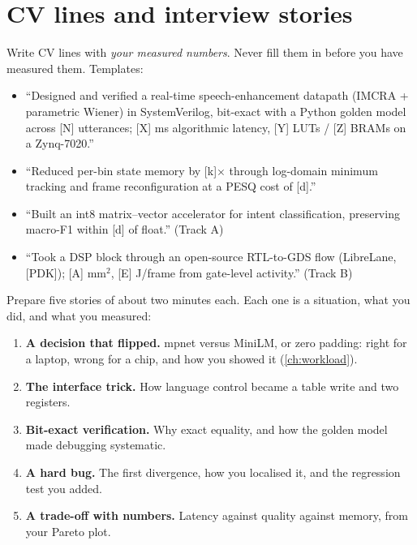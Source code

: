 \section{CV lines and interview stories}\label{sec:writeup:cv}

Write CV lines with \emph{your measured numbers}. Never fill them in before you
have measured them. Templates:
\begin{itemize}
  \item \enquote{Designed and verified a real-time speech-enhancement datapath
        (IMCRA + parametric Wiener) in SystemVerilog, bit-exact with a Python
        golden model across [N] utterances; [X] ms algorithmic latency, [Y]
        LUTs / [Z] BRAMs on a Zynq-7020.}
  \item \enquote{Reduced per-bin state memory by [k]$\times$ through log-domain
        minimum tracking and frame reconfiguration at a PESQ cost of [d].}
  \item \enquote{Built an int8 matrix--vector accelerator for intent
        classification, preserving macro-F1 within [d] of float.} (Track A)
  \item \enquote{Took a DSP block through an open-source RTL-to-GDS flow
        (LibreLane, [PDK]); [A] mm$^2$, [E] \textmu J/frame from gate-level
        activity.} (Track B)
\end{itemize}

Prepare five stories of about two minutes each. Each one is a situation, what
you did, and what you measured:
\begin{enumerate}
  \item \textbf{A decision that flipped.} mpnet versus MiniLM, or zero padding:
        right for a laptop, wrong for a chip, and how you showed it
        (\cref{ch:workload}).
  \item \textbf{The interface trick.} How language control became a table write
        and two registers.
  \item \textbf{Bit-exact verification.} Why exact equality, and how the golden
        model made debugging systematic.
  \item \textbf{A hard bug.} The first divergence, how you localised it, and the
        regression test you added.
  \item \textbf{A trade-off with numbers.} Latency against quality against
        memory, from your Pareto plot.
\end{enumerate}

